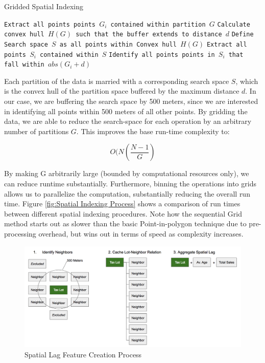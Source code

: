 \documentclass[12pt,]{article}
\begin{document}
\begin{algorithm}
  \caption{Gridded Spatial Indexing}
  \label{alg:spatial1}
  \begin{algorithmic}[1]
        \State \texttt{Extract all points points $G_i$ contained within partition $G$}
        \State \texttt{Calculate convex hull $H(G)$ such that the buffer extends to distance $d$}
        \State \texttt{Define Search space $S$ as all points within Convex hull $H(G)$}
        \State \texttt{Extract all points $S_i$ contained within $S$}
            \State \texttt{Identify all points points in $S_i$ that fall within $abs(G_i+d)$}
        \EndFor
      \EndFor
  \end{algorithmic}
\end{algorithm}

\noindent Each partition of the data is married with a corresponding
search space \(S\), which is the convex hull of the partition space
buffered by the maximum distance \(d\). In our case, we are buffering
the search space by 500 meters, since we are interested in identifying
all points within 500 meters of all other points. By gridding the data,
we are able to reduce the search-space for each operation by an
arbitrary number of partitions \(G\). This improves the base run-time
complexity to:

\[
O(N(\frac{N-1}{G})
\]

\noindent By making G arbitrarily large (bounded by computational
resources only), we can reduce runtime substantially. Furthermore,
binning the operations into grids allows us to parallelize the
computation, substantially reducing the overall run time. Figure
\ref{fig:Spatial Indexing Process} shows a comparison of run times
between different spatial indexing procedures. Note how the sequential
Grid method starts out as slower than the basic Point-in-polygon
technique due to pre-processing overhead, but wins out in terms of speed
as complexity increases.

\begin{figure}[H]
\includegraphics[width=1\linewidth]{Sections/tables and figures/Spatial Lag Creation} \caption{Spatial Lag Feature Creation Process}\label{fig:Spatial Lag Feataure Process}
\end{figure}
\end{document}
